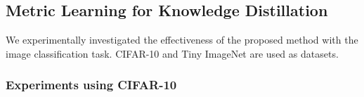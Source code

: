\documentclass[twocolumn,10pt]{article}
\begin{document}



\begin{table}[ht]
\begin{center}
\caption{AUC and accuracy for multi-class classification}
\label{table:AUC_ACC_multi}
\end{center}
\end{table}

\subsection{Metric Learning for Knowledge Distillation}
We experimentally investigated the effectiveness of the proposed method with the image classification task.
CIFAR-10 and Tiny ImageNet \cite{Le2015} are used as datasets.

\subsubsection{Experiments using CIFAR-10}
\end{document}
